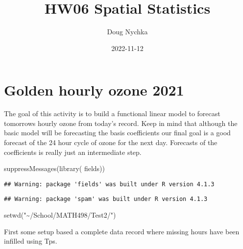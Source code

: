\documentclass[
]{article}
\title{HW06 Spatial Statistics}
\author{Doug Nychka}
\date{2022-11-12}
\newenvironment{Shaded}{\begin{snugshade}}{\end{snugshade}}
\newcommand{\FunctionTok}[1]{\textcolor[rgb]{0.00,0.00,0.00}{#1}}
\newcommand{\NormalTok}[1]{#1}
\newcommand{\StringTok}[1]{\textcolor[rgb]{0.31,0.60,0.02}{#1}}
\begin{document}
\maketitle

\hypertarget{golden-hourly-ozone-2021}{%
\section{Golden hourly ozone 2021}\label{golden-hourly-ozone-2021}}

The goal of this activity is to build a functional linear model to
forecast tomorrows hourly ozone from today's record. Keep in mind that
although the basic model will be forecasting the basis coefficients our
final goal is a good forecast of the 24 hour cycle of ozone for the next
day. Forecasts of the coefficients is really just an intermediate step.

\begin{Shaded}
\begin{Highlighting}[]
\FunctionTok{suppressMessages}\NormalTok{(}\FunctionTok{library}\NormalTok{( fields))}
\end{Highlighting}
\end{Shaded}

\begin{verbatim}
## Warning: package 'fields' was built under R version 4.1.3
\end{verbatim}

\begin{verbatim}
## Warning: package 'spam' was built under R version 4.1.3
\end{verbatim}

\begin{Shaded}
\begin{Highlighting}[]
\FunctionTok{setwd}\NormalTok{(}\StringTok{"\textasciitilde{}/School/MATH498/Test2/"}\NormalTok{)}
\end{Highlighting}
\end{Shaded}

First some setup based a complete data record where missing hours have
been infilled using Tps.
\end{document}
